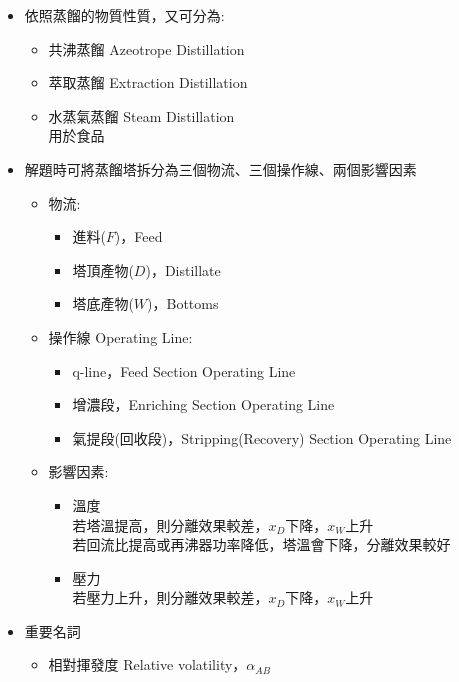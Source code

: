 \documentclass[../main.tex]{subfiles}
\begin{document}
\begin{itemize}
\begin{itemize}
\begin{enumerate}
      達到Steady State，塔內液體組成不隨時間改變\\
      效果最好，量又大，四台當中最常用
    \end{enumerate}
  \end{itemize}
  \item 依照蒸餾的物質性質，又可分為:
  \begin{itemize}
    \item 共沸蒸餾 Azeotrope Distillation
    \item 萃取蒸餾 Extraction Distillation
    \item 水蒸氣蒸餾 Steam Distillation\\
    用於食品
  \end{itemize}
  \item 解題時可將蒸餾塔拆分為三個物流、三個操作線、兩個影響因素
  \begin{itemize}
    \item 物流:
    \begin{itemize}
      \item 進料($F$)，Feed
      \item 塔頂產物($D$)，Distillate
      \item 塔底產物($W$)，Bottoms
    \end{itemize}
    \item 操作線 Operating Line:
    \begin{itemize}
      \item q-line，Feed Section Operating Line
      \item 增濃段，Enriching Section Operating Line
      \item 氣提段(回收段)，Stripping(Recovery) Section Operating Line
    \end{itemize}
    \item 影響因素:
    \begin{itemize}
      \item 溫度\\
      若塔溫提高，則分離效果較差，$x_D$下降，$x_W$上升\\
      若回流比提高或再沸器功率降低，塔溫會下降，分離效果較好
      \item 壓力\\
      若壓力上升，則分離效果較差，$x_D$下降，$x_W$上升
    \end{itemize}
  \end{itemize}
  \item 重要名詞
  \begin{itemize}
    \item 相對揮發度 Relative volatility，$\alpha_{AB}$\\

\end{itemize}
\end{itemize}
\end{document}
